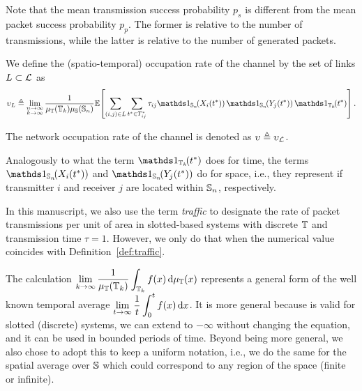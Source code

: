 Note that the mean transmission success probability $p_s$ is different from the mean packet success probability $p_p$. The former is relative to the number of transmissions, while the latter is relative to the number of generated packets.


\begin{definition} \label{def:traffic}
    We define the (spatio-temporal) occupation rate of the channel by the set of links $L\subset\cal{L}$ as
    \begin{align*}
        \upsilon_L \triangleq \lim_{\substack{n\to\infty\\k \to \infty}} \frac{1}{\mu_\T(\T_k)\mu_\S(\S_n)} \E\!\left[  \sum_{(i,j)\in{L}}\sum_{t^*\in T_{ij}^*} \tau_{ij} \ind_{\S_n}\!(X_i(t^*))\,\ind_{\S_n}\!(Y_j(t^*))\, \ind_{\T_k}\!(t^*) \right].
    \end{align*}

    The network occupation rate of the channel is denoted as $\upsilon \triangleq \upsilon_\cal{L}$.
\end{definition}

Analogously to what the term $\ind_{\T_k}\!(t^*)$ does for time, the terms $\ind_{\S_n}\!(X_i(t^*))$ and $\ind_{\S_n}\!(Y_j(t^*))$ do for space, i.e., they represent if transmitter $i$ and receiver $j$ are located within $\S_n$, respectively.

In this manuscript, we also use the term \textit{traffic} to designate the rate of packet transmissions per unit of area in slotted-based systems with discrete $\T$ and transmission time $\tau = 1$.
%
However, we only do that when the numerical value coincides with Definition~\ref{def:traffic}.

\begin{note}
    The calculation $\displaystyle\lim_{k\to\infty}\frac{1}{\mu_\T(\T_k)} \int_{\T_k} f(x) \,\d\mu_\T(x)$ represents a general form of the well known temporal average $\displaystyle\lim_{t\to\infty}\frac{1}{t} \int_0^t f(x) \,\d x$.
    It is more general because is valid for slotted (discrete) systems, we can extend to $-\infty$ without changing the equation, and it can be used in bounded periods of time. Beyond being more general, we also chose to adopt this to keep a uniform notation, i.e., we do the same for the spatial average over $\S$ which could correspond to any region of the space (finite or infinite).
\end{note}

